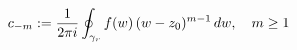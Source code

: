 \documentclass[preview]{standalone}
\begin{document}
\begin{align*}
\special{dvisvgm:raw <g id='unique000'>}c_{-m} := \frac{1}{2\pi i}\oint_{\gamma_r} f(w)\,(w-z_0)^{m-1}\,dw,\quad m \ge 1\special{dvisvgm:raw </g>}
\end{align*}
\end{document}
